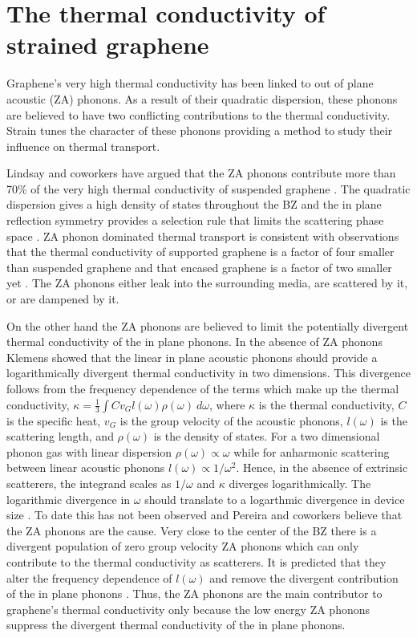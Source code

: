 \chapter{The thermal conductivity of strained graphene\label{chap:therm}}
Graphene's very high thermal conductivity has been linked to out of plane acoustic (ZA) phonons.
As a result of their quadratic dispersion, these phonons are believed to have two conflicting contributions to the thermal conductivity.
Strain tunes the character of these phonons providing a method to study their influence on thermal transport.

Lindsay and coworkers have argued that the ZA phonons contribute more than 70\% of the very high thermal conductivity of suspended graphene \cite{Seol2010}.
The quadratic dispersion gives a  high density of states throughout the BZ and the in plane reflection symmetry provides a selection rule that limits the scattering phase space \cite{Lindsay2010}.
ZA phonon dominated thermal transport is consistent with observations that the thermal conductivity of supported graphene \cite{Seol2010,Cai2010} is a factor of four smaller than suspended graphene \cite{Balandin2008,Cai2010,Chen2011a,Lee2011} and that encased graphene is a factor of two smaller yet \cite{Jang2010}.
The ZA phonons either leak into the surrounding media, are scattered by it, or are dampened by it.

On the other hand the ZA phonons are believed to limit the potentially divergent thermal conductivity of the in plane phonons.
In the absence of ZA phonons Klemens showed that the linear in plane acoustic phonons should provide a logarithmically divergent thermal conductivity in two dimensions.
This divergence follows from the frequency dependence of the terms which make up the thermal conductivity, $\kappa=\frac{1}{3} \int C v_G l(\omega) \rho(\omega) \ d\omega $, where $\kappa$ is the thermal conductivity, $C$ is the specific heat, $v_G$ is the group velocity of the acoustic phonons, $l(\omega)$ is the scattering length, and $\rho(\omega)$ is the density of states.
For a two dimensional phonon gas with linear dispersion $\rho(\omega) \propto \omega$ while for anharmonic scattering between linear acoustic phonons $l(\omega) \propto 1/\omega^2$.
Hence, in the absence of extrinsic scatterers, the integrand scales as $1/\omega$ and $\kappa$ diverges logarithmically.
The logarithmic divergence in $\omega$ should translate to a logarthmic divergence in device size \cite{Klemens2001}.
To date this has not been observed \cite{Chen2011a} and Pereira and coworkers believe that the ZA phonons are the cause.
Very close to the center of the BZ there is a divergent population of zero group velocity ZA phonons which can only contribute to the thermal conductivity as scatterers.
It is predicted that they alter the frequency dependence of $l(\omega)$ and remove the divergent contribution of the in plane phonons \cite{Pereira2013}.
Thus, the ZA phonons are the main contributor to graphene's thermal conductivity only because the low energy ZA phonons suppress the divergent thermal conductivity of the in plane phonons.

